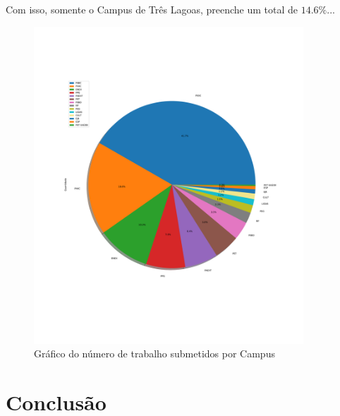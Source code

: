 \documentclass[a4paper, 12pt]{article}
\begin{document}
Com isso, somente o Campus de Três Lagoas, preenche um total de $14.6\%$...
\begin{figure}[h]
	\centering
	\includegraphics[width=0.9\textwidth]{../img/programa_pie.pdf}
	\caption{Gráfico do número de trabalho submetidos por Campus}
	\label{}
\end{figure}
\newpage

\section{Conclusão}
\lipsum[3]
\end{document}
